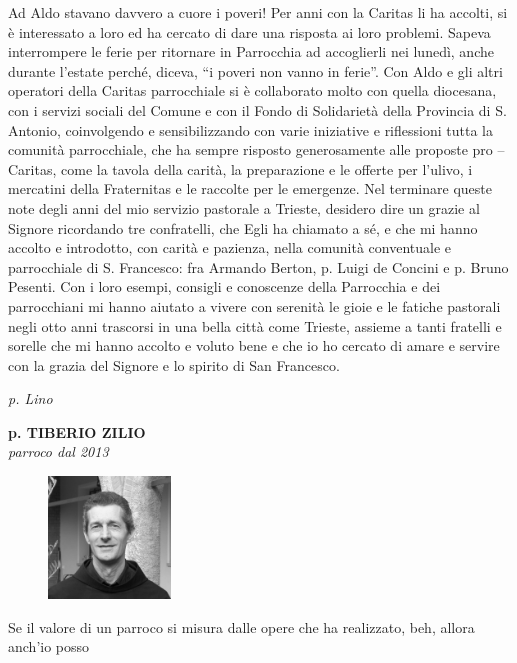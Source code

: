 Ad Aldo stavano davvero a cuore i poveri! Per anni con la Caritas li ha accolti, si è interessato a 
loro ed ha cercato di dare una risposta ai loro problemi.
Sapeva interrompere le ferie per ritornare in Parrocchia ad accoglierli nei lunedì, anche durante 
l'estate perché, diceva, “i poveri non vanno in ferie”.
Con Aldo e gli altri operatori della Caritas parrocchiale si è collaborato molto con quella diocesana, 
con i servizi sociali del Comune e con il Fondo di Solidarietà della Provincia di S. Antonio, 
coinvolgendo e sensibilizzando con varie iniziative e riflessioni tutta la comunità parrocchiale, che 
ha sempre risposto generosamente alle proposte pro – Caritas, come la tavola della carità, la 
preparazione e le offerte per l'ulivo, i mercatini della Fraternitas e le raccolte per le emergenze.
Nel  terminare queste note degli anni del mio servizio pastorale a Trieste, desidero dire un 
grazie al Signore ricordando tre confratelli, che Egli ha chiamato a sé, e che mi hanno accolto e 
introdotto, con carità e pazienza, nella comunità conventuale e parrocchiale di S. Francesco: fra 
Armando Berton, p. Luigi de Concini e p. Bruno Pesenti.
Con i loro esempi, consigli e conoscenze della Parrocchia e dei parrocchiani mi hanno aiutato a 
vivere con serenità le gioie e le fatiche pastorali negli otto anni trascorsi in una bella città come 
Trieste, assieme a tanti fratelli e sorelle che mi hanno accolto e voluto bene e che io ho cercato di 
amare e servire con la grazia del Signore e lo spirito di San Francesco. 
\begin{flushright}
\textit{p. Lino}
\end{flushright}
\endgroup
\newpage
\begin{center}
\textbf{\Large p. TIBERIO ZILIO}\\
	\textit{parroco dal 2013}
\end{center}
\bigbreak
\begingroup
\setlength\intextsep{0pt}
\begin{figure}
\centering
\includegraphics[width=0.29\textwidth]{immagini/tiberio.jpg}
\end{figure}
\noindent Se il valore di un parroco si misura dalle opere che ha realizzato, beh, allora anch’io posso
